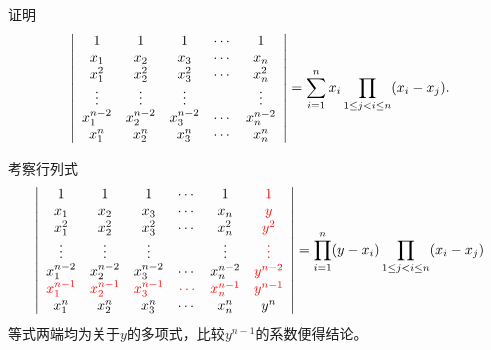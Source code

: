 \begin{frame}
  \begin{footnotesize}
    \begin{exampleblock}{44}
      证明
      $$
      \left|
      \begin{array}{ccccc}
        1&1&1&\cdots&1\\
        x_1&x_2&x_3&\cdots&x_n\\
        x_1^2&x_2^2&x_3^2&\cdots&x_n^2\\
        \vdots&\vdots&\vdots&&\vdots\\
        x_1^{n-2}&x_2^{n-2}&x_3^{n-2}&\cdots&x_n^{n-2}\\
        x_1^{n}&x_2^{n}&x_3^{n}&\cdots&x_n^{n}\\
      \end{array}
      \right| = \sum_{i=1}^{n}x_i \prod_{1\le j < i \le n}(x_i-x_j).
      $$
    \end{exampleblock}
    \pause
    \proofname
    考察行列式
    $$
    \left|
    \begin{array}{cccccc}
      1&1&1&\cdots&1&\textcolor{red}{1}\\
      x_1&x_2&x_3&\cdots&x_n&\textcolor{red}{y}\\
      x_1^2&x_2^2&x_3^2&\cdots&x_n^2&\textcolor{red}{y^2}\\
      \vdots&\vdots&\vdots&&\vdots&\textcolor{red}{\vdots}\\
      x_1^{n-2}&x_2^{n-2}&x_3^{n-2}&\cdots&x_n^{n-2}&\textcolor{red}{y^{n-2}}\\
      \textcolor{red}{x_1^{n-1}}&\textcolor{red}{x_2^{n-1}}&\textcolor{red}{x_3^{n-1}}&\textcolor{red}{\cdots}&\textcolor{red}{x_n^{n-1}}&\textcolor{red}{y^{n-1}}\\
      x_1^{n}&x_2^{n}&x_3^{n}&\cdots&x_n^{n}&y^n\\
    \end{array}
    \right| = \prod_{i=1}^n(y-x_i) \prod_{1\le j < i \le n} (x_i-x_j)
    $$
    等式两端均为关于$y$的多项式，比较$y^{n-1}$的系数便得结论。
  \end{footnotesize}
\end{frame}

